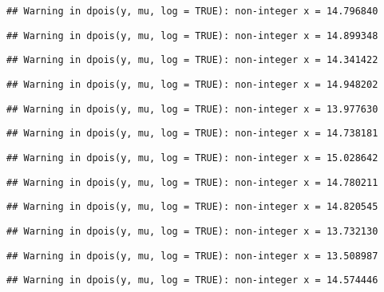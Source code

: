\documentclass[
]{article}
\begin{document}
\begin{verbatim}
## Warning in dpois(y, mu, log = TRUE): non-integer x = 14.796840
\end{verbatim}

\begin{verbatim}
## Warning in dpois(y, mu, log = TRUE): non-integer x = 14.899348
\end{verbatim}

\begin{verbatim}
## Warning in dpois(y, mu, log = TRUE): non-integer x = 14.341422
\end{verbatim}

\begin{verbatim}
## Warning in dpois(y, mu, log = TRUE): non-integer x = 14.948202
\end{verbatim}

\begin{verbatim}
## Warning in dpois(y, mu, log = TRUE): non-integer x = 13.977630
\end{verbatim}

\begin{verbatim}
## Warning in dpois(y, mu, log = TRUE): non-integer x = 14.738181
\end{verbatim}

\begin{verbatim}
## Warning in dpois(y, mu, log = TRUE): non-integer x = 15.028642
\end{verbatim}

\begin{verbatim}
## Warning in dpois(y, mu, log = TRUE): non-integer x = 14.780211
\end{verbatim}

\begin{verbatim}
## Warning in dpois(y, mu, log = TRUE): non-integer x = 14.820545
\end{verbatim}

\begin{verbatim}
## Warning in dpois(y, mu, log = TRUE): non-integer x = 13.732130
\end{verbatim}

\begin{verbatim}
## Warning in dpois(y, mu, log = TRUE): non-integer x = 13.508987
\end{verbatim}

\begin{verbatim}
## Warning in dpois(y, mu, log = TRUE): non-integer x = 14.574446
\end{verbatim}
\end{document}
